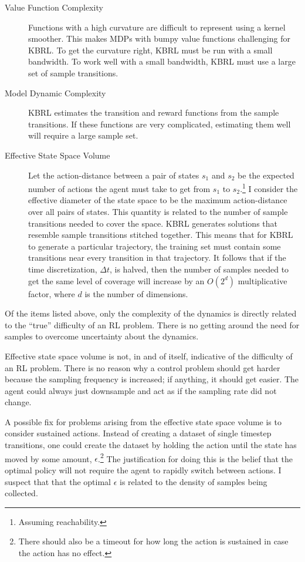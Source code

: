 \begin{description}
\item[Value Function Complexity]
Functions with a high curvature are difficult to represent using a
kernel smoother.
This makes MDPs with bumpy value functions challenging for KBRL.
To get the curvature right, KBRL must be run with a small bandwidth.
To work well with a small bandwidth, KBRL must use a large set
of sample transitions.

\item[Model Dynamic Complexity]
KBRL estimates the transition and reward functions from the sample
transitions.
If these functions are very complicated, estimating them
well will require a large sample set.

\item[Effective State Space Volume]
Let the action-distance between a pair of states $s_1$ and $s_2$ be the
expected number of actions the agent must take to get from $s_1$ to
$s_2$.\footnote{Assuming reachability.}
I consider the effective diameter of the state space to be the maximum
action-distance over all pairs of states.
This quantity is related to the number of sample transitions needed to
cover the space.
KBRL generates solutions that resemble sample transitions stitched together.
This means that for KBRL to generate a particular trajectory, the training
set must contain some transitions near every transition in that trajectory.
It follows that if the time discretization, $\Delta t$, is halved, then the
number of samples needed to get the same level of coverage will increase by
an $O(2^d)$ multiplicative factor, where $d$ is the number of dimensions.
\end{description}

Of the items listed above, only the complexity of the dynamics is
directly related to the ``true'' difficulty of an RL problem.
There is no getting around the need for samples to overcome
uncertainty about the dynamics.

Effective state space volume is not, in and of itself, indicative of the
difficulty of an RL problem.
There is no reason why a control problem should get harder because the
sampling frequency is increased; if anything, it should get easier.
The agent could always just downsample and act as if the sampling
rate did not change.

A possible fix for problems arising from the effective state space volume
is to consider sustained actions.
Instead of creating a dataset of single timestep transitions,
one could create the dataset by holding the action until the state has
moved by some amount, $\epsilon$.\footnote{There should also be a
timeout for how long the action is sustained in case the action has no effect.}
The justification for doing this is the belief that the optimal policy will
not require the agent to rapidly switch between actions.
I suspect that that the optimal $\epsilon$ is related to the density of
samples being collected.

